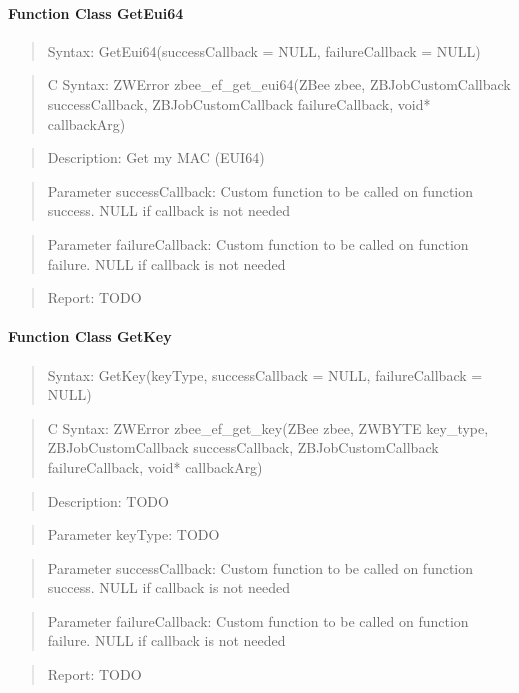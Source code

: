 \paragraph{Function Class GetEui64}
\begin{quote}Syntax: GetEui64(successCallback = NULL, failureCallback = NULL)\end{quote}
\begin{quote}C Syntax: ZWError zbee\_ef\_get\_eui64(ZBee zbee, ZBJobCustomCallback successCallback, ZBJobCustomCallback failureCallback, void* callbackArg)\end{quote}
\begin{quote}Description: Get my MAC (EUI64)\end{quote}
\begin{quote}Parameter successCallback: Custom function to be called on function success. NULL if callback is not needed\end{quote}
\begin{quote}Parameter failureCallback: Custom function to be called on function failure. NULL if callback is not needed\end{quote}
\begin{quote}Report: TODO\end{quote}

\paragraph{Function Class GetKey}
\begin{quote}Syntax: GetKey(keyType, successCallback = NULL, failureCallback = NULL)\end{quote}
\begin{quote}C Syntax: ZWError zbee\_ef\_get\_key(ZBee zbee, ZWBYTE key\_type, ZBJobCustomCallback successCallback, ZBJobCustomCallback failureCallback, void* callbackArg)\end{quote}
\begin{quote}Description: TODO\end{quote}
\begin{quote}Parameter keyType: TODO\end{quote}
\begin{quote}Parameter successCallback: Custom function to be called on function success. NULL if callback is not needed\end{quote}
\begin{quote}Parameter failureCallback: Custom function to be called on function failure. NULL if callback is not needed\end{quote}
\begin{quote}Report: TODO\end{quote}

